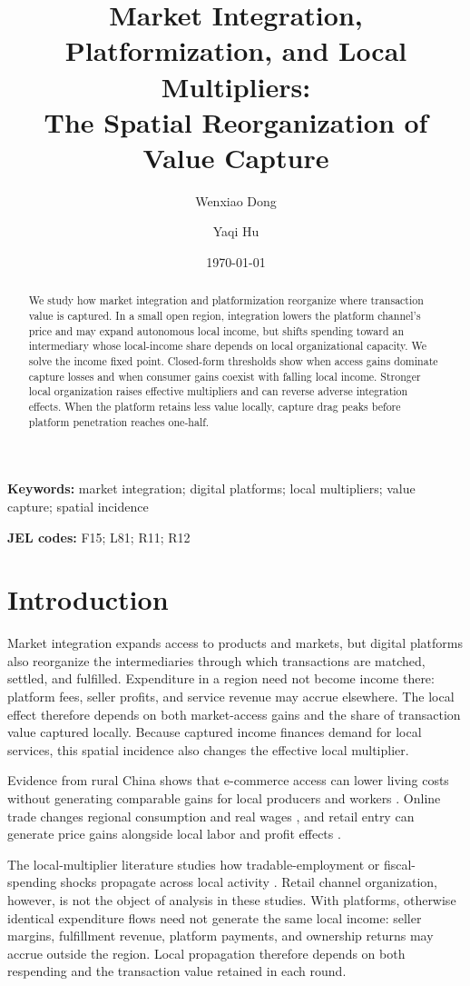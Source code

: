 \documentclass[11pt]{article}
\title{Market Integration, Platformization, and Local Multipliers:\\
The Spatial Reorganization of Value Capture}
\author{Wenxiao Dong \and Yaqi Hu}
\date{\today}
\theoremstyle{plain}
\theoremstyle{definition}
\begin{document}
\maketitle

\begin{abstract}
We study how market integration and platformization reorganize where
transaction value is captured. In a small open region, integration lowers the
platform channel's price and may expand autonomous local income, but shifts
spending toward an intermediary whose local-income share depends on local
organizational capacity. We solve the income fixed point. Closed-form
thresholds show when access gains dominate capture losses and when consumer
gains coexist with falling local income. Stronger local organization raises
effective multipliers and can reverse adverse integration effects. When the
platform retains less value locally, capture drag peaks before platform
penetration reaches one-half.
\end{abstract}

\noindent\textbf{Keywords:} market integration; digital platforms; local
multipliers; value capture; spatial incidence

\medskip
\noindent\textbf{JEL codes:} F15; L81; R11; R12

\section{Introduction}
\label{sec:introduction}

Market integration expands access to products and markets, but digital
platforms also reorganize the intermediaries through which transactions are
matched, settled, and fulfilled. Expenditure in a region need not become
income there: platform fees, seller profits, and service revenue may accrue
elsewhere. The local effect therefore depends on both market-access gains and
the share of transaction value captured locally. Because captured income
finances demand for local services, this spatial incidence also changes the
effective local multiplier.

Evidence from rural China shows that e-commerce access can lower living costs
without generating comparable gains for local producers and workers
\citep{couture2021connecting}. Online trade changes regional consumption and
real wages \citep{fan2018alibaba}, and retail entry can generate price gains
alongside local labor and profit effects \citep{atkin2018retail}.

The local-multiplier literature studies how tradable-employment or
fiscal-spending shocks propagate across local activity
\citep{moretti2010local,chodorowreich2019geographic}. Retail channel
organization, however, is not the object of analysis in these studies. With
platforms, otherwise identical expenditure flows need not generate the same
local income: seller margins, fulfillment revenue, platform payments, and
ownership returns may accrue outside the region. Local propagation therefore
depends on both respending and the transaction value retained in each round.
\end{document}
